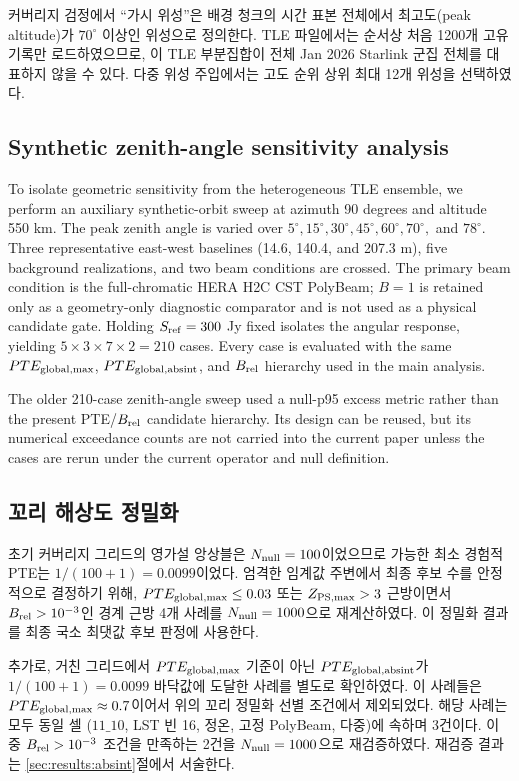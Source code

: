 \documentclass[final,5p,times]{elsarticle}
\newcommand{\NTailRefinedCases}{4}
\newcommand{\PTEMinHundred}{1/(100+1)=0.0099}
\newcommand{\NAbsintFloorHitsCoarse}{3}
\newcommand{\NAbsintFloorAboveGate}{2}
\begin{document}
커버리지 검정에서 ``가시 위성''은 배경 청크의 시간 표본 전체에서 최고도(peak altitude)가
$70^\circ$ 이상인 위성으로 정의한다. TLE 파일에서는 순서상 처음 1200개 고유 기록만
로드하였으므로, 이 TLE 부분집합이 전체 Jan 2026 Starlink 군집 전체를 대표하지 않을 수 있다.
다중 위성 주입에서는 고도 순위 상위 최대 12개 위성을 선택하였다.

\subsection{Synthetic zenith-angle sensitivity analysis}
\label{sec:experiments:za_sweep}

To isolate geometric sensitivity from the heterogeneous TLE ensemble, we
perform an auxiliary synthetic-orbit sweep at azimuth 90 degrees and altitude
550 km. The peak zenith angle is varied over
$5^\circ,15^\circ,30^\circ,45^\circ,60^\circ,70^\circ,$ and $78^\circ$.
Three representative east-west baselines (14.6, 140.4, and 207.3 m), five
background realizations, and two beam conditions are crossed. The primary beam
condition is the full-chromatic HERA H2C CST PolyBeam; $B=1$ is retained only
as a geometry-only diagnostic comparator and is not used as a physical
candidate gate. Holding $S_{\rm ref}=300$ Jy fixed isolates the angular
response, yielding $5\times3\times7\times2=210$ cases. Every case is evaluated
with the same $PTE_{\rm global,max}$, $PTE_{\rm global,absint}$, and
$B_{\rm rel}$ hierarchy used in the main analysis.

The older 210-case zenith-angle sweep used a null-p95 excess metric rather
than the present PTE/$B_{\rm rel}$ candidate hierarchy. Its design can be
reused, but its numerical exceedance counts are not carried into the current
paper unless the cases are rerun under the current operator and null
definition.

\subsection{꼬리 해상도 정밀화}
\label{sec:experiments:tail}

초기 커버리지 그리드의 영가설 앙상블은 $N_{\rm null}=100$이었으므로 가능한 최소 경험적 PTE는
$\PTEMinHundred$이었다. 엄격한 임계값 주변에서 최종 후보 수를 안정적으로 결정하기 위해,
$PTE_{\rm global,max}\le0.03$ 또는 $Z_{\rm PS,max}>3$ 근방이면서 $B_{\rm rel}>10^{-3}$인 경계 근방 \NTailRefinedCases{}개
사례를 $N_{\rm null}=1000$으로 재계산하였다. 이 정밀화 결과를 최종 국소 최댓값 후보 판정에 사용한다.

추가로, 거친 그리드에서 $PTE_{\rm global,max}$ 기준이 아닌 $PTE_{\rm global,absint}$가 $\PTEMinHundred$
바닥값에 도달한 사례를 별도로 확인하였다. 이 사례들은 $PTE_{\rm global,max}\approx0.7$이어서 위의 꼬리
정밀화 선별 조건에서 제외되었다. 해당 사례는 모두 동일 셀
($11\_10$, LST 빈 16, 정온, 고정 PolyBeam, 다중)에 속하며 \NAbsintFloorHitsCoarse{}건이다. 이 중
$B_{\rm rel}>10^{-3}$ 조건을 만족하는 \NAbsintFloorAboveGate{}건을 $N_{\rm null}=1000$으로 재검증하였다.
재검증 결과는 \ref{sec:results:absint}절에서 서술한다.
\end{document}
